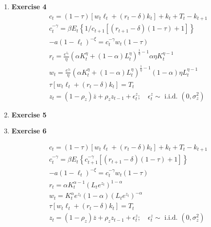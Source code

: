 \documentclass[12pt, letterpaper,bibtotoc, tablecaptionabove, figurecaptionabove]{article}
\begin{document}
\begin{enumerate}
\item{\bf{Exercise 4}}
\begin{eqnarray*}
c_{t}=(1-\tau)\left[w_{t} \ell_{t}+\left(r_{t}-\delta\right) k_{t}\right]+k_{t}+T_{t}-k_{t+1}\\
c_t^{-\gamma}=\beta E_{t}\left\{1/c_{t+1}\left[\left(r_{t+1}-\delta\right)(1-\tau)+1\right]\right\}\\
-a(1-\ell_t)^{-\xi}=c_t^{-\gamma} w_{t}(1-\tau)\\
r_t=\frac{e^{z_t}}{\eta}(\alpha K_t^\eta+(1-\alpha)L_t^\eta)^{\frac{1}{\eta}-1}\alpha\eta K_t^{\eta-1} \\
 w_t=\frac{e^{z_t}}{\eta}(\alpha K_t^\eta+(1-\alpha)L_t^\eta)^{\frac{1}{\eta}-1}(1-\alpha)\eta L_t^{\eta-1} \\ 
{\tau\left[w_{t} \ell_{t}+\left(r_{t}-\delta\right) k_{t}\right]=T_{t}} \\ 
{z_{t}=\left(1-\rho_{z}\right) \overline{z}+\rho_{z} z_{t-1}+\epsilon_{t}^{z} ; \quad \epsilon_{t}^{z} \sim \text { i.i.d. }\left(0, \sigma_{z}^{2}\right)}
\end{eqnarray*}

\item{\bf{Exercise 5}}


\item{\bf{Exercise 6}}

\begin{eqnarray*}
c_{t}=(1-\tau)\left[w_{t} \ell_{t}+\left(r_{t}-\delta\right) k_{t}\right]+k_{t}+T_{t}-k_{t+1}\\
c_t^{-\gamma}=\beta E_{t}\left\{c_{t+1}^{-\gamma}\left[\left(r_{t+1}-\delta\right)(1-\tau)+1\right]\right\}\\
-a(1-\ell_t)^{-\xi}=c_t^{-\gamma} w_{t}(1-\tau)\\
r_t=\alpha K_t^{\alpha-1}(L_t e^{z_t})^{1-\alpha} \\
 w_t=K_t^\alpha e^{z_t}(1-\alpha)(L_t e^{z_t})^{-\alpha}\\ 
{\tau\left[w_{t} \ell_{t}+\left(r_{t}-\delta\right) k_{t}\right]=T_{t}} \\ 
{z_{t}=\left(1-\rho_{z}\right) \overline{z}+\rho_{z} z_{t-1}+\epsilon_{t}^{z} ; \quad \epsilon_{t}^{z} \sim \text { i.i.d. }\left(0, \sigma_{z}^{2}\right)}
\end{eqnarray*}


\end{enumerate}
\end{document}
